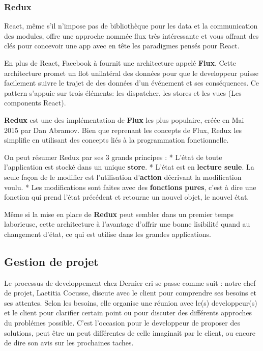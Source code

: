 \documentclass[12pt,a4paper]{article}
\begin{document}
  \bigskip

  \subsubsection{Redux}\label{redux}

  React, même s'il n'impose pas de bibliothèque pour les data et la
  communication des modules, offre une approche nommée flux très
  intéressante et vous offrant des clés pour concevoir une app avec en
  tête les paradigmes pensés pour React.

  En plus de React, Facebook à fournit une architecture appelé
  \textbf{Flux}. Cette architecture promet un flot unilatéral des données
  pour que le developpeur puisse facilement suivre le trajet de des
  données d'un événement et ses conséquences. Ce pattern s'appuie sur
  trois éléments: les dispatcher, les stores et les vues (Les components
  React).

  \textbf{Redux} est une des implémentation de \textbf{Flux} les plus
  populaire, créée en Mai 2015 par Dan Abramov. Bien que reprenant les
  concepts de Flux, Redux les simplifie en utilisant des concepts liés à
  la programmation fonctionnelle.

  On peut résumer Redux par ses 3 grands principes : * L'état de toute
  l'application est stocké dans un unique \textbf{store}. * L'état est en
  \textbf{lecture seule}. La seule façon de le modifier est l'utilisation
  d'\textbf{action} décrivant la modification voulu. * Les modifications
  sont faites avec des \textbf{fonctions pures}, c'est à dire une fonction
  qui prend l'état précédent et retourne un nouvel objet, le nouvel état.

  Même si la mise en place de \textbf{Redux} peut sembler dans un premier
  temps laborieuse, cette architecture à l'avantage d'offrir une bonne
  lisibilité quand au changement d'état, ce qui est utilise dans les
  grandes applications.

  \subsection{Gestion de projet}\label{gestion-de-projet}

  Le processus de developpement chez Dernier cri se passe comme suit :
  notre chef de projet, Laetitia Cocusse, discute avec le client pour
  comprendre ses besoins et ses attentes. Selon les besoins, elle organise
  une réunion avec le(s) developpeur(s) et le client pour clarifier
  certain point ou pour discuter des différents approches du problémes
  possible. C'est l'occasion pour le developpeur de proposer des
  solutions, peut être un peut différentes de celle imaginait par le
  client, ou encore de dire son avis sur les prochaines taches.
\end{document}
